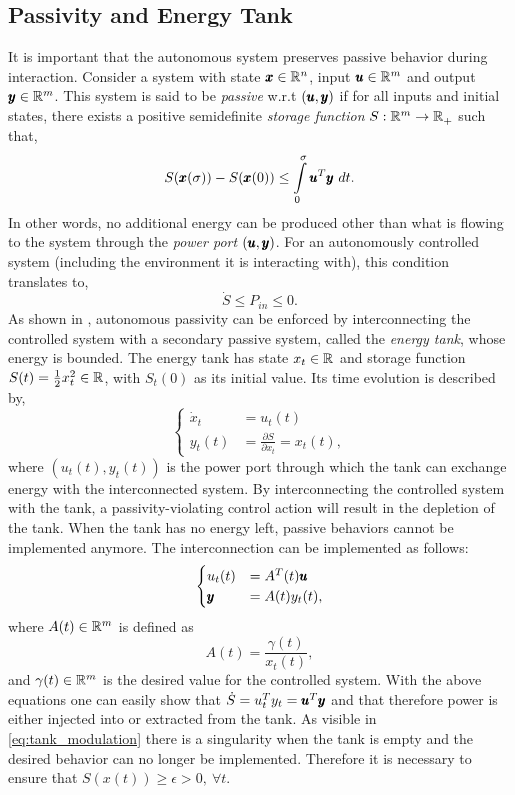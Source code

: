 \subsection{Passivity and Energy Tank}
It is important that the autonomous system preserves passive behavior during interaction. Consider a system with state $\pmb{x} \in \mathbb{R}^{n}$, input $\pmb{u} \in \mathbb{R}^{m}$ and output $\pmb{y} \in \mathbb{R}^{m}$. 
This system is said to be \emph{passive} w.r.t $(\pmb{u},\pmb{y})$ if for all inputs and initial states, there exists a positive semidefinite \emph{storage function} $S: \mathbb{R}^{m} \rightarrow \mathbb{R}^{}_+$ such that,
\begin{equation}
    S(\pmb{x}(\sigma)) - S(\pmb{x}(0))\leq \int\limits_{0}^{\sigma} \pmb{u}^T \pmb{y}\ dt.  
\end{equation}
In other words, no additional energy can be produced other than what is flowing to the system through the \textit{power port} $(\pmb{u},\pmb{y})$.
For an autonomously controlled system (including the environment it is interacting with), this condition translates to, 
\begin{equation}
    \dot{S} \leq P_{in} \leq 0.
\end{equation}
As shown in \cite{shahriari2018valve}, autonomous passivity can be enforced by interconnecting the controlled system with a secondary passive system, called the \emph{energy tank}, whose energy is bounded. The energy tank has state $x_t \in \mathbb{R}^{}$ and storage function $S(t) = \frac{1}{2} x_t^2 \in \mathbb{R}^{}$, with $S_t(0)$ as its initial value. Its time evolution is described by,
\begin{equation}
\begin{cases}
\dot{x}_t &= u_t(t) \\
y_t(t) &= \frac{\partial S}{\partial x_t} = x_t(t),
\end{cases}
\end{equation}
where $(u_t(t), y_t(t))$ is the power port through which the tank can exchange energy with the interconnected system. By interconnecting the controlled system with the tank, a passivity-violating control action will result in the depletion of the tank. When the tank has no energy left, passive behaviors cannot be implemented anymore. The interconnection can be implemented as follows:
\begin{equation}
\begin{cases}
    u_t(t) &= A^T(t) \pmb{u} \\
    \pmb{y} &= A(t) y_t(t),
\end{cases}
\end{equation}
where $A(t) \in \mathbb{R}^{m}$ is defined as
\begin{equation} \label{eq:tank_modulation}
    A(t) = \frac{\gamma(t)}{x_t(t)},
\end{equation}
and $\gamma(t) \in \mathbb{R}^{m}$ is the desired value for the controlled system. With the above equations one can easily show that $\dot{S} = u_t^T y_t = \pmb{u}^T \pmb{y}$ and that therefore power is either injected into or extracted from the tank. As visible in \eqn \ref{eq:tank_modulation} there is a singularity when the tank is empty and the desired behavior can no longer be implemented. Therefore it is necessary to ensure that $S(x(t)) \geq \epsilon > 0, \ \forall t$.